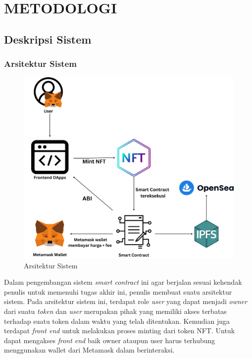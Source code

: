 \chapter{METODOLOGI}
\label{chap:desainimplementasi}


\section{Deskripsi Sistem}
\subsection{Arsitektur Sistem}
\begin{figure} [H] \centering
  \includegraphics[scale=0.17]{gambar/desain_sistem_new.png}
  \caption{Arsitektur Sistem}
  \label{fig:flowtransaksi}
\end{figure}

Dalam pengembangan sistem \emph{smart contract} ini agar berjalan sesuai kehendak penulis untuk memenuhi tugas akhir ini, penulis membuat suatu arsitektur sistem. Pada arsitektur sistem ini, terdapat role \emph{user} yang dapat menjadi \emph{owner} dari suatu \emph{token} dan \emph{user} merupakan pihak yang memiliki akses terbatas terhadap suatu token dalam waktu yang telah ditentukan. Kemudian juga terdapat \emph{front end} untuk melakukan proses minting dari token NFT. Untuk dapat mengakses \emph{front end} baik owner ataupun user harus terhubung menggunakan wallet dari Metamask dalam berinteraksi.

